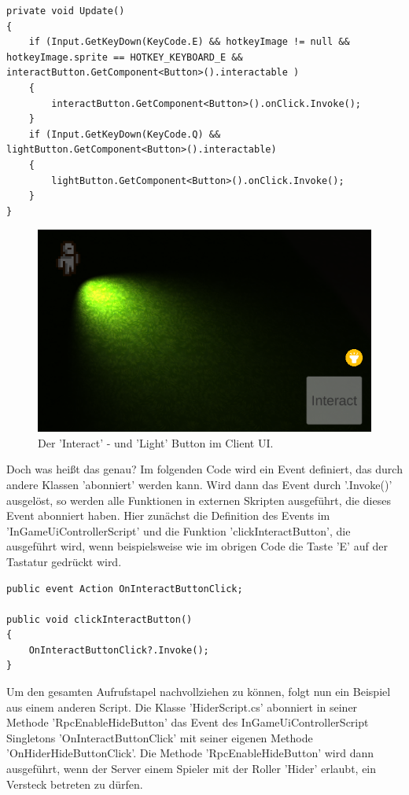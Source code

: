 \begin{lstlisting}[caption= InGameUiControllerScript.cs Update Method]
private void Update()
{
	if (Input.GetKeyDown(KeyCode.E) && hotkeyImage != null && hotkeyImage.sprite == HOTKEY_KEYBOARD_E && interactButton.GetComponent<Button>().interactable )
	{
		interactButton.GetComponent<Button>().onClick.Invoke();
	}
	if (Input.GetKeyDown(KeyCode.Q) && lightButton.GetComponent<Button>().interactable)
	{
		lightButton.GetComponent<Button>().onClick.Invoke();
	}
}
\end{lstlisting}

\begin{figure}[H]
	\centering
	\includegraphics[width=120mm]{images/prototyp_interact_light_button.png}
	\caption[Interact and Light Button]{Der 'Interact' - und 'Light' Button im Client UI.}
	\label{pic:prototyp_interact_light_button}
\end{figure}

Doch was heißt das genau? Im folgenden Code wird ein Event definiert, das durch andere Klassen 'abonniert' werden kann. Wird dann das Event durch '.Invoke()' ausgelöst, so werden alle Funktionen in externen Skripten ausgeführt, die dieses Event abonniert haben. Hier zunächst die Definition des Events im 'InGameUiControllerScript' und die Funktion 'clickInteractButton', die ausgeführt wird, wenn beispielsweise wie im obrigen Code die Taste 'E' auf der Tastatur gedrückt wird.

\begin{lstlisting}[caption= InGameUiControllerScript.cs OnInteractButtonClick Event]
public event Action OnInteractButtonClick;	

public void clickInteractButton()
{
	OnInteractButtonClick?.Invoke();
}
\end{lstlisting}

Um den gesamten Aufrufstapel nachvollziehen zu können, folgt nun ein Beispiel aus einem anderen Script.
Die Klasse 'HiderScript.cs' abonniert in seiner Methode 'RpcEnableHideButton' das Event des InGameUiControllerScript Singletons 'OnInteractButtonClick' mit seiner eigenen Methode 'OnHiderHideButtonClick'. Die Methode 'RpcEnableHideButton' wird dann ausgeführt, wenn der Server einem Spieler mit der Roller 'Hider' erlaubt, ein Versteck betreten zu dürfen.

